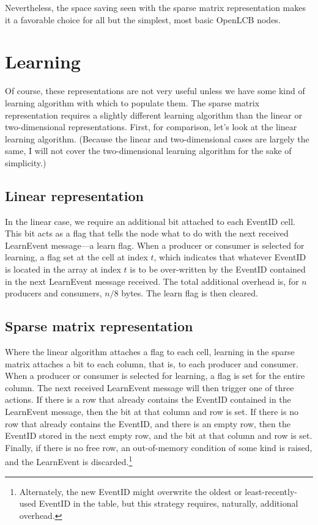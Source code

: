 \documentclass[11pt]{article}
\begin{document}
Nevertheless, the space saving seen with the sparse matrix representation makes it a favorable choice for all but the simplest, most basic OpenLCB nodes.

\section{Learning}

Of course, these representations are not very useful unless we have some kind of learning algorithm with which to populate them. The sparse matrix representation requires a slightly different learning algorithm than the linear or two-dimensional representations. First, for comparison, let's look at the linear learning algorithm. (Because the linear and two-dimensional cases are largely the same, I will not cover the two-dimensional learning algorithm for the sake of simplicity.)

\subsection{Linear representation}

In the linear case, we require an additional bit attached to each EventID cell. This bit acts as a flag that tells the node what to do with the next received LearnEvent message---a learn flag. When a producer or consumer is selected for learning, a flag set at the cell at index $t$, which indicates that whatever EventID is located in the array at index $t$ is to be over-written by the EventID contained in the next LearnEvent message received. The total additional overhead is, for $n$ producers and consumers, $n/8$ bytes. The learn flag is then cleared.

\subsection{Sparse matrix representation}

Where the linear algorithm attaches a flag to each cell, learning in the sparse matrix attaches a bit to each column, that is, to each producer and consumer. When a producer or consumer is selected for learning, a flag is set for the entire column. The next received LearnEvent message will then trigger one of three actions. If there is a row that already contains the EventID contained in the LearnEvent message, then the bit at that column and row is set. If there is no row that already contains the EventID, and there is an empty row, then the EventID stored in the next empty row, and the bit at that column and row is set. Finally, if there is no free row, an out-of-memory condition of some kind is raised, and the LearnEvent is discarded.\footnote{Alternately, the new EventID might overwrite the oldest or least-recently-used EventID in the table, but this strategy requires, naturally, additional overhead.}
\end{document}
